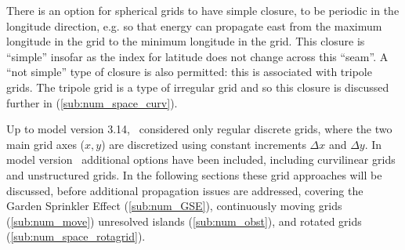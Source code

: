 There is an option for spherical grids to have simple closure, to be periodic
 in the longitude direction, e.g. so that energy can propagate east from the maximum longitude in the grid to the minimum longitude in the grid. This closure is ``simple'' insofar as the index for latitude does not change across this ``seam''. A ``not simple'' type of closure is also permitted: this is associated with tripole grids. The tripole grid is a type of irregular grid and so this closure is discussed further in (\ref{sub:num_space_curv}).
 
Up to model version 3.14, \ws\ considered only regular discrete grids,
where the two main grid axes ($x,y$) are discretized using constant
increments $\Delta x$ and $\Delta y$. In model version \WWver\
additional options have been included, including curvilinear grids and
unstructured grids. In the following sections these grid approaches
will be discussed, before additional propagation issues are addressed,
covering the Garden Sprinkler Effect (\ref{sub:num_GSE}), continuously
moving grids (\ref{sub:num_move}) unresolved islands
(\ref{sub:num_obst}), and rotated grids (\ref{sub:num_space_rotagrid}).
